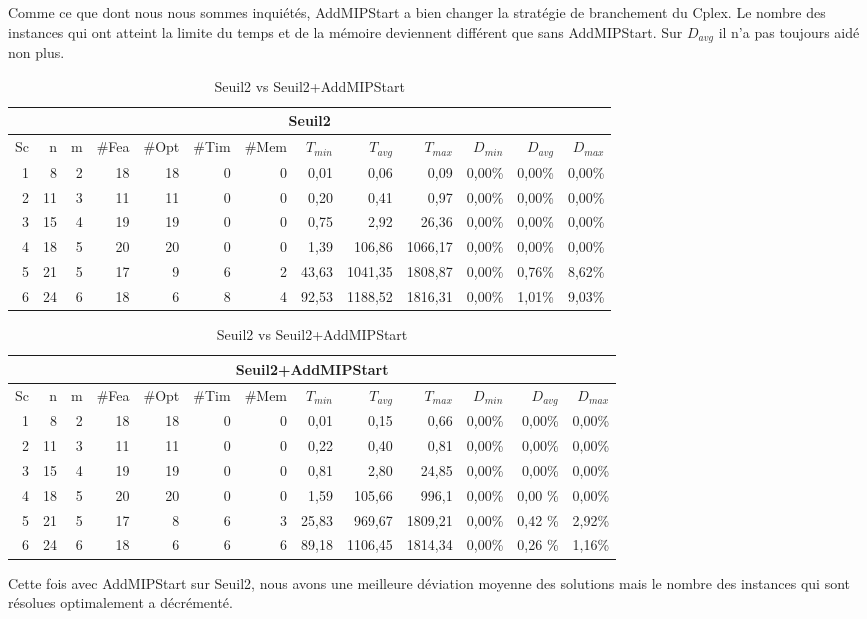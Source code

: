 \documentclass[twoside,fleqn]{EPURapport}
\begin{document}
\bigskip
Comme ce que dont nous nous sommes inquiétés, AddMIPStart a bien changer la stratégie de branchement du Cplex. Le nombre des instances qui ont atteint la limite du temps et de la mémoire deviennent différent que sans AddMIPStart. Sur $D_{avg}$ il n'a pas toujours aidé non plus.
\clearpage
\begin{table}[h]
    \centering
    \begin{tabular}{|r|r|r|r|r|r|r|r|r|r|r|r|r|}
    	\hline
    	\multicolumn{13}{|c|}{Seuil2}\\ \hline
Sc &	n	&m	&\#Fea	&\#Opt	&\#Tim &\#Mem	&$T_{min}$ & $T_{avg}$	& $T_{max}$ & $D_{min}$ & $D_{avg}$	& $D_{max}$ \\ \hline
1&	8 &	2&	18&	18&	0&	0&	0,01&	0,06&	0,09	&0,00\%&	0,00\%&	0,00\%    \\ \hline
2&	11&	3&	11&	11&	0&	0&	0,20&	0,41&	0,97	&0,00\%&	0,00\%&	0,00\%     \\ \hline
3&	15&	4&	19&	19&	0&	0&	0,75&	2,92&	26,36	&0,00\%&	0,00\%&	0,00\%  \\ \hline
4 &	18	&5	&20	&20	&0	&0	&1,39	&106,86	    &1066,17	&0,00\%&	0,00\%&	0,00\% \\ \hline
5 &	21	&5	&17	&9	&6	&2	&43,63	&1041,35	&1808,87	&0,00\%&	0,76\%&	8,62\% \\ \hline
6 &	24	&6	&18	&6	&8	&4	&92,53	&1188,52	&1816,31	&0,00\%&	1,01\%&	9,03\% \\ \hline
    \end{tabular}
\vspace{2em}
    \begin{tabular}{|r|r|r|r|r|r|r|r|r|r|r|r|r|}
    	\hline
    	\multicolumn{13}{|c|}{Seuil2+AddMIPStart}\\ \hline
Sc &	n	&m	&\#Fea	&\#Opt	&\#Tim &\#Mem	&$T_{min}$ & $T_{avg}$	& $T_{max}$ & $D_{min}$ & $D_{avg}$	& $D_{max}$ \\ \hline
1&	8 &	2&	18&	18&	0&	0&	0,01&	0,15&	0,66	&0,00\%&	0,00\%&	0,00\%    \\ \hline
2&	11&	3&	11&	11&	0&	0&	0,22&	0,40&	0,81	&0,00\%&	0,00\%&	0,00\%     \\ \hline
3&	15&	4&	19&	19&	0&	0&	0,81&	2,80&	24,85	&0,00\%&	0,00\%&	0,00\%  \\ \hline
4 &	18	&5	&20	&20	&0	&0	&1,59	&105,66	   & 996,1	&   0,00\%&	0,00	\%&0,00\% \\ \hline
5 &	21	&5	&17	&8	&6	&3	&25,83	&969,67	   & 1809,21&	0,00\%&	0,42	\%&2,92\% \\ \hline
6 &	24	&6	&18	&6	&6	&6	&89,18	&1106,45	&1814,34&	0,00\%&	0,26	\%&1,16\% \\ \hline

    \end{tabular} 
    \caption{Seuil2 vs Seuil2+AddMIPStart}
    \label{tab_cut2_ams2_tab2}
\end{table}
\bigskip
Cette fois avec AddMIPStart sur Seuil2, nous avons une meilleure déviation moyenne des solutions mais le nombre des instances qui sont résolues optimalement a décrémenté. 
\end{document}
